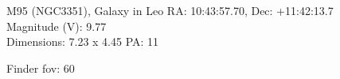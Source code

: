 \begin{block}{M95 (NGC3351), Galaxy in Leo}
    RA: 10:43:57.70, Dec: +11:42:13.7 \\ 
    Magnitude (V): 9.77 \\ 
    Dimensions: 7.23 x 4.45 PA: 11 

    Finder fov: 60 
\end{block}
